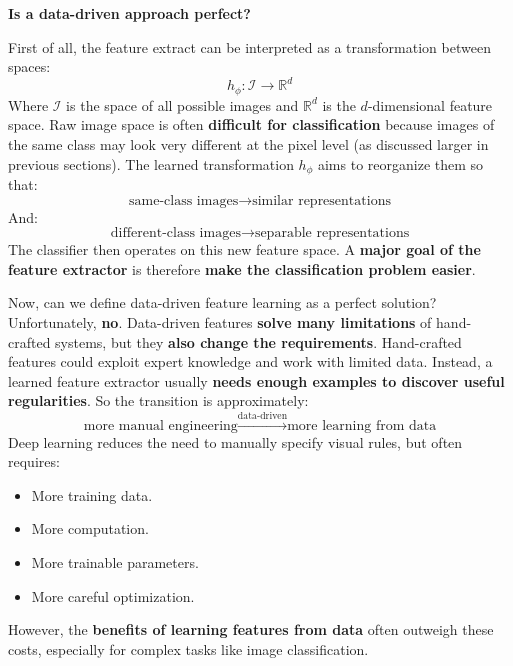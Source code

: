 \highspace
\begin{flushleft}
    \textcolor{Green3}{ \textbf{Is a data-driven approach perfect?}}
\end{flushleft}
First of all, the feature extract can be interpreted as a transformation between spaces:
\begin{equation*}
    h_{\phi}: \mathcal{I} \to \mathbb{R}^{d}
\end{equation*}
Where $\mathcal{I}$ is the space of all possible images and $\mathbb{R}^{d}$ is the $d$-dimensional feature space. Raw image space is often \textbf{difficult for classification} because images of the same class may look very different at the pixel level (as discussed larger in previous sections). The learned transformation $h_{\phi}$ aims to reorganize them so that:
\begin{equation*}
    \text{same-class images} \to \text{similar representations}
\end{equation*}
And:
\begin{equation*}
    \text{different-class images} \to \text{separable representations}
\end{equation*}
The classifier then operates on this new feature space. A \textbf{major goal of the feature extractor} is therefore \textbf{make the classification problem easier}.

\highspace
\textcolor{Red2}{} Now, can we define data-driven feature learning as a perfect solution? Unfortunately, \textbf{no}. Data-driven features \textbf{solve many limitations} of hand-crafted systems, but they \textbf{also change the requirements}. Hand-crafted features could exploit expert knowledge and work with limited data. Instead, a learned feature extractor usually \textbf{needs enough examples to discover useful regularities}. So the transition is approximately:
\begin{equation*}
    \text{more manual engineering} \xrightarrow{\text{data-driven}} \text{more learning from data}
\end{equation*}
Deep learning reduces the need to manually specify visual rules, but often requires:
\begin{itemize}
    \item[\textcolor{Red2}{\faIcon{exclamation}}] More training data.
    \item[\textcolor{Red2}{\faIcon{exclamation}}] More computation.
    \item[\textcolor{Red2}{\faIcon{exclamation}}] More trainable parameters.
    \item[\textcolor{Red2}{\faIcon{exclamation}}] More careful optimization.
\end{itemize}
However, the \textbf{benefits of learning features from data} often outweigh these costs, especially for complex tasks like image classification.

